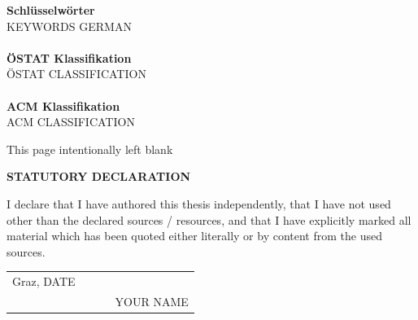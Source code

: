 {%
\vfill
\noindent
\textbf{Schlüsselwörter}\\
KEYWORDS GERMAN\\
\\
\textbf{ÖSTAT Klassifikation}\\
ÖSTAT CLASSIFICATION\\
\\
\textbf{ACM Klassifikation}\\
ACM CLASSIFICATION

\clearpage
\begin{center}
This page intentionally left blank
\end{center}
\clearpage



\begin{center}
\textbf{STATUTORY DECLARATION}
\end{center}

\noindent
I declare that I have authored this thesis independently, that I have
not used other than the declared sources / resources, and that I have
explicitly marked all material which has been quoted either literally
or by content from the used sources.


\vspace{1cm}

\begin{flushleft}
\begin{tabular}{lclc}
Graz, DATE & {\hspace*{3cm}} & ~\hfill &  \underline{\hspace*{5cm}} \\
~\hfill & {\hspace*{3cm}} & ~\hfill &  YOUR NAME   \\
\end{tabular}
\end{flushleft}


\vspace{2cm}

%
%
%
%
%
%

}
